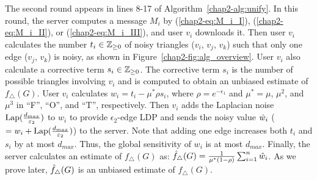 The second round appears in lines 8-17 of Algorithm~\ref{chap2-alg:unify}.
In this round, the server computes a message $M_i$
by (\ref{chap2-eq:M_i_I}), (\ref{chap2-eq:M_i_II}), or (\ref{chap2-eq:M_i_III}),
and user $v_i$ downloads it.
Then user $v_i$ calculates the number $t_i \in \mathbb{Z}_{\ge0}$ of noisy triangles ($v_i$, $v_j$, $v_k$) such that
only one edge ($v_j$, $v_k$) is noisy, as shown in Figure~\ref{chap2-fig:alg_overview}.
User $v_i$ also calculate a corrective term $s_i \in \mathbb{Z}_{\ge0}$.
The corrective term $s_i$ is the number of
possible triangles involving $v_i$ 
and is computed to obtain an unbiased estimate of $f_\triangle(G)$.
User $v_i$ calculates $w_i = t_i - \mu^* \rho s_i$, where $\rho = e^{-\epsilon_1}$ and
$\mu^* = \mu$, $\mu^2$, and $\mu^3$
in ``F'', ``O'', and ``T'', respectively.
Then $v_i$ adds the Laplacian noise $\textrm{Lap}(\frac{d_{max}}{\varepsilon_2})$ to $w_i$ to provide $\epsilon_2$-edge LDP and sends the noisy value $\hat{w}_i$ ($= w_i + \textrm{Lap}(\frac{d_{max}}{\varepsilon_2})$) to the server. 
Note that adding one edge increases both $t_i$ and $s_i$ 
by at most $d_{max}$. 
Thus, the global sensitivity of $w_i$ is at most $d_{max}$. 
Finally, the server calculates an estimate of $f_\triangle(G)$ as: $\hat{f}_\triangle(G) = \frac{1}{\mu^*(1-\rho)}\sum_{i=1}^n \hat{w}_i$.
As we prove later, $\hat{f}_\triangle(G)$ is an unbiased estimate of $f_\triangle(G)$.



